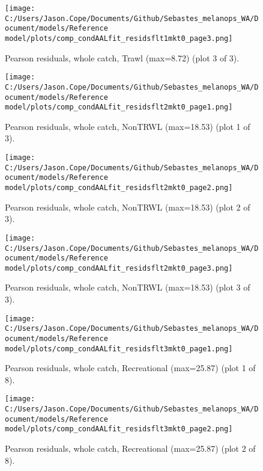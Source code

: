 \documentclass[11pt,
  english,
  letterpaper,
]{article}
\begin{document}
\begin{figure}
\centering
\texttt{[image: C:/Users/Jason.Cope/Documents/Github/Sebastes\_melanops\_WA/Document/models/Reference model/plots/comp\_condAALfit\_residsflt1mkt0\_page3.png]}
\caption{Pearson residuals, whole catch, Trawl (max=8.72) (plot 3 of 3).\label{fig:comp_condAALfit_residsflt1mkt0_page3}}
\end{figure}

\begin{figure}
\centering
\texttt{[image: C:/Users/Jason.Cope/Documents/Github/Sebastes\_melanops\_WA/Document/models/Reference model/plots/comp\_condAALfit\_residsflt2mkt0\_page1.png]}
\caption{Pearson residuals, whole catch, NonTRWL (max=18.53) (plot 1 of 3).\label{fig:comp_condAALfit_residsflt2mkt0_page1}}
\end{figure}

\begin{figure}
\centering
\texttt{[image: C:/Users/Jason.Cope/Documents/Github/Sebastes\_melanops\_WA/Document/models/Reference model/plots/comp\_condAALfit\_residsflt2mkt0\_page2.png]}
\caption{Pearson residuals, whole catch, NonTRWL (max=18.53) (plot 2 of 3).\label{fig:comp_condAALfit_residsflt2mkt0_page2}}
\end{figure}

\begin{figure}
\centering
\texttt{[image: C:/Users/Jason.Cope/Documents/Github/Sebastes\_melanops\_WA/Document/models/Reference model/plots/comp\_condAALfit\_residsflt2mkt0\_page3.png]}
\caption{Pearson residuals, whole catch, NonTRWL (max=18.53) (plot 3 of 3).\label{fig:comp_condAALfit_residsflt2mkt0_page3}}
\end{figure}

\begin{figure}
\centering
\texttt{[image: C:/Users/Jason.Cope/Documents/Github/Sebastes\_melanops\_WA/Document/models/Reference model/plots/comp\_condAALfit\_residsflt3mkt0\_page1.png]}
\caption{Pearson residuals, whole catch, Recreational (max=25.87) (plot 1 of 8).\label{fig:comp_condAALfit_residsflt3mkt0_page1}}
\end{figure}

\begin{figure}
\centering
\texttt{[image: C:/Users/Jason.Cope/Documents/Github/Sebastes\_melanops\_WA/Document/models/Reference model/plots/comp\_condAALfit\_residsflt3mkt0\_page2.png]}
\caption{Pearson residuals, whole catch, Recreational (max=25.87) (plot 2 of 8).\label{fig:comp_condAALfit_residsflt3mkt0_page2}}
\end{figure}
\end{document}
